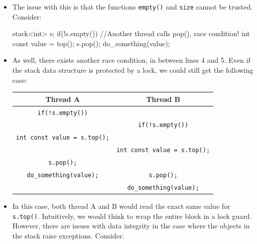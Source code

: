 \documentclass[11pt, a4paper]{article}
\theoremstyle{definition}
\theoremstyle{remark}
\newcommand{\code}[1]{\lstinline|#1|}
\begin{document}
\begin{itemize}
\begin{cppcode}
template<typename T, typename Container = std::deque<T>>
class stack {
public:
    explicit stack(const Container&);
    explicit stack(Container&& = Container());
    template <class Alloc> explicit stack(const Alloc&);
    template <class Alloc> stack(const Container&, const Alloc&);
    template <class Alloc> stack(Container&&, const Alloc&);
    template <class Alloc> stack(stack&&, const Alloc&);
    bool empty() const;
    size_t size() const;
    T& top();
    T const& top() const;
    void push(T const&);
    void push(T&&);
    void pop();
    void swap(stack&&);
    template <class... Args> void emplace(Args&&... args)
};
\end{cppcode}
    \item The issue with this is that the functions \code{empty()} and \code{size} cannot be trusted. Consider:
\begin{cppcode}
stack<int> s;
if(!s.empty()) { //Another thread calls pop(), race condition!
    int const value = top();
    s.pop();
    do_something(value);
}
\end{cppcode}
    \item As well, there exists another race condition, in between lines 4 and 5. Even if the stack data structure is protected by a lock, we could still get the following case:
\begin{center}
\begin{tabular}{c c}
\hline
Thread A & Thread B \\
\hline
\hline
\code{if(!s.empty())} & \\
                      & \code{if(!s.empty())} \\
\code{int const value = s.top();} & \\
                          & \code{int const value = s.top();} \\
\code{s.pop();} & \\
\code{do_something(value);} & \code{s.pop();} \\
                            & \code{do_something(value);}\\
\hline
\end{tabular}
\end{center}
    \item In this case, both thread A and B would read the exact same value for \code{s.top()}. Intuitively, we would think to wrap the entire block in a lock guard. However, there are issues with data integrity in the case where the objects in the stack raise exceptions. Consider:

\end{itemize}
\end{document}
